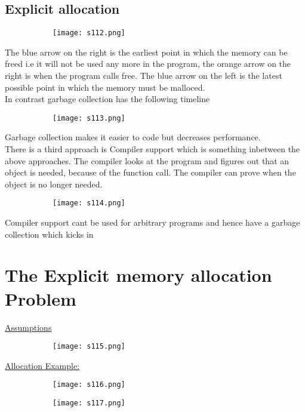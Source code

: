 \documentclass[8pt]{extreport}
\begin{document}
\subsection{Explicit allocation}
\begin{figure}[H]
\centering
\begin{subfigure}[b]{0.4\linewidth}
\texttt{[image: s112.png]}
\end{subfigure}
\end{figure}
The blue arrow on the right is the earliest point in which the memory can be freed i.e it will not be used any more in the program, the orange arrow on the right is when the program calls free. The blue arrow on the left is the latest possible point in which the memory must be malloced.\\
In contrast garbage collection has the following timeline
\begin{figure}[H]
\centering
\begin{subfigure}[b]{0.4\linewidth}
\texttt{[image: s113.png]}
\end{subfigure}
\end{figure}
Garbage collection makes it easier to code but decreases performance.\\
There is a third approach is Compiler support which is something inbetween the above approaches.  The compiler looks at the program and figures out that an object is needed, because of the function call. The compiler can prove when the object is no longer needed.
\begin{figure}[H]
\centering
\begin{subfigure}[b]{0.4\linewidth}
\texttt{[image: s114.png]}
\end{subfigure}
\end{figure}
Compiler support cant be used for arbitrary programs and hence have a garbage collection which kicks in

\section{The Explicit memory allocation Problem}

\underline{Assumptions}
\begin{figure}[H]
\centering
\begin{subfigure}[b]{0.4\linewidth}
\texttt{[image: s115.png]}
\end{subfigure}
\end{figure}
\underline{Allocation Example:}
\begin{figure}[H]
\centering
\begin{subfigure}[b]{0.4\linewidth}
\texttt{[image: s116.png]}
\end{subfigure}
\begin{subfigure}[b]{0.4\linewidth}
\texttt{[image: s117.png]}
\end{subfigure}
\end{figure}
\end{document}
